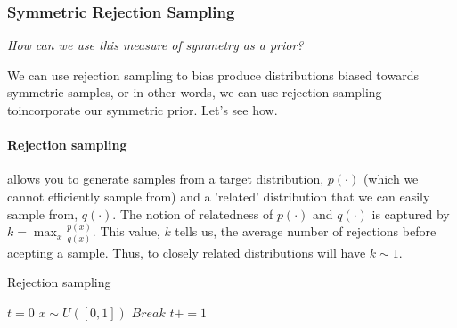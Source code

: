 

\subsubsection{Symmetric Rejection Sampling}\label{rejection-sampling}

\begin{displayquote}
	\textit{How can we use this measure of symmetry as a prior?}
\end{displayquote}

We can use rejection sampling to bias produce distributions biased towards symmetric
samples, or in other words, we can use rejection sampling toincorporate our symmetric prior. Let's see how.

\paragraph{Rejection sampling} allows you to generate samples from a target distribution, $p(\cdot)$ (which we cannot efficiently sample from) and a 'related' distribution that we can easily sample from, $q(\cdot)$.
The notion of relatedness of $p(\cdot)$ and $q(\cdot)$ is captured by $k = \mathop{\text{max}}_x \frac{p(x)}{q(x)}$.
This value, $k$ tells us, the average number of rejections before acepting a sample.
Thus, to closely related distributions will have $k\sim 1$. \cite{W.R.1992, Owen2013}

\begin{algorithm}
	\caption{Rejection sampling}
	\begin{algorithmic}[1]

		\State $t=0$
			\State $x\sim U([0, 1])$
				\State $Break$
			\EndIf
			\State $t += 1$
		\EndWhile
		\State {}
		\EndProcedure

	\end{algorithmic}
\end{algorithm}

